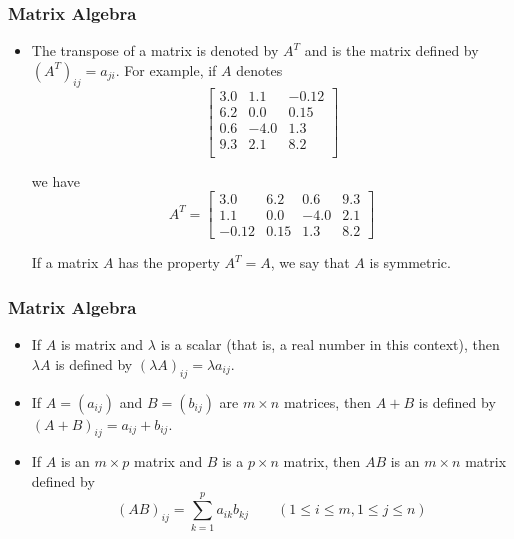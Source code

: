 \documentclass[notheorems,mathserif,table,compress]{beamer}  %
\begin{document}
\begin{frame}
\frametitle{Matrix Algebra}
\begin{itemize}
\item The \textsf{transpose} of a matrix is denoted by $A^{T}$ and is the matrix defined by $(A^{T})_{ij}=a_{ji}$. For example, if $A$ denotes 
\begin{displaymath}
\left[\begin{array}{ccc}
3.0 & 1.1 & -0.12 \\
6.2 & 0.0 &  0.15\\
0.6 & -4.0 & 1.3\\
9.3 & 2.1 & 8.2 \\
\end{array} \right]
\end{displaymath}

we have
\begin{displaymath}
A^T=
\left[\begin{array}{cccc}
3.0 & 6.2 & 0.6 & 9.3 \\
1.1 & 0.0 & -4.0 & 2.1\\
-0.12 & 0.15 & 1.3 & 8.2
\end{array} \right]
\end{displaymath}

If a matrix $A$ has the property $A^T=A$, we say that $A$ is \textsf{symmetric}.
\end{itemize}
\end{frame}

\begin{frame}
\frametitle{Matrix Algebra}
\begin{itemize}
\item If $A$ is matrix and $\lambda$ is a scalar (that is, a real number in this context), then $\lambda A$ is defined by $(\lambda A)_{ij}=\lambda a_{ij}$.
\item If $A=(a_{ij})$ and $B=(b_{ij})$ are $m\times n$ matrices, then $A+B$ is defined by $(A+B)_{ij}=a_{ij}+b_{ij}$.
\item If $A$ is an $m\times p$ matrix and $B$ is a $p\times n$ matrix, then $AB$ is an $m\times n$ matrix defined by  
\begin{displaymath}
(AB)_{ij}=\sum^{p}_{k=1}a_{ik}b_{kj} \qquad (1\leq i\leq m, 1\leq j \leq n)
\end{displaymath}

\end{itemize}
\end{frame}
\end{document}
